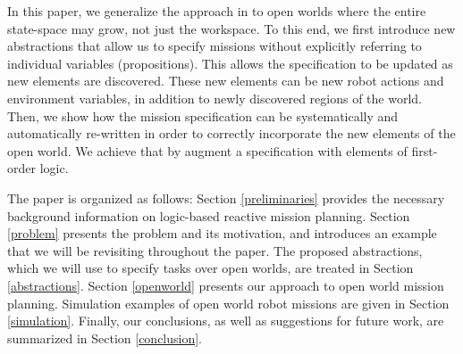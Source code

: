 In this paper, we generalize the approach in \cite{BingxinRSS2012} to open worlds where the entire state-space may grow, not just the workspace. 
To this end, we first introduce new abstractions that allow us to specify missions without explicitly referring to individual variables (propositions). This allows the specification to be updated as new elements are discovered. These new elements can be new robot actions and environment variables, in addition to newly discovered regions of the world. 
Then, we show how the mission specification can be systematically and automatically re-written in order to correctly incorporate the new elements of the open world. We achieve that by augment a specification with elements of first-order logic.

The paper is organized as follows: Section \ref{preliminaries} provides the necessary background information on logic-based reactive mission planning. Section \ref{problem} presents the problem and its motivation, and introduces an example that we will be revisiting throughout the paper. The proposed abstractions, which we will use to specify tasks over open worlds, are treated in Section \ref{abstractions}. Section \ref{openworld} presents our approach to open world mission planning. Simulation examples of open world robot missions are given in Section \ref{simulation}. Finally, our conclusions, as well as suggestions for future work, are summarized in Section \ref{conclusion}.


